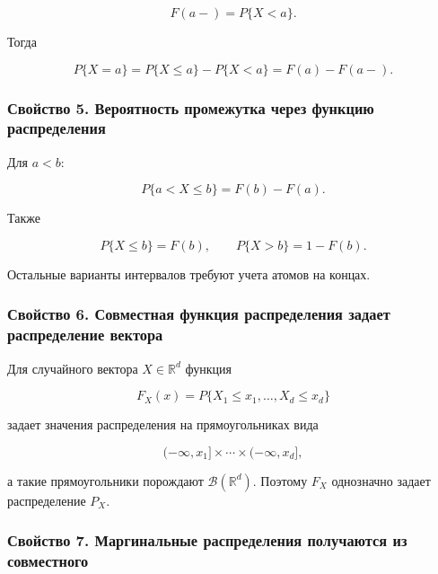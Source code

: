 \documentclass[
  11pt,
  a4paper,
]{article}
\begin{document}
\[
F(a-)=P\{X<a\}.
\]

Тогда

\[
P\{X=a\}=P\{X\le a\}-P\{X<a\}=F(a)-F(a-).
\]

\subsubsection{Свойство 5. Вероятность промежутка через функцию
распределения}\label{ux441ux432ux43eux439ux441ux442ux432ux43e-5.-ux432ux435ux440ux43eux44fux442ux43dux43eux441ux442ux44c-ux43fux440ux43eux43cux435ux436ux443ux442ux43aux430-ux447ux435ux440ux435ux437-ux444ux443ux43dux43aux446ux438ux44e-ux440ux430ux441ux43fux440ux435ux434ux435ux43bux435ux43dux438ux44f}

Для \(a<b\):

\[
P\{a<X\le b\}=F(b)-F(a).
\]

Также

\[
P\{X\le b\}=F(b),\qquad
P\{X>b\}=1-F(b).
\]

Остальные варианты интервалов требуют учета атомов на концах.

\subsubsection{Свойство 6. Совместная функция распределения задает
распределение
вектора}\label{ux441ux432ux43eux439ux441ux442ux432ux43e-6.-ux441ux43eux432ux43cux435ux441ux442ux43dux430ux44f-ux444ux443ux43dux43aux446ux438ux44f-ux440ux430ux441ux43fux440ux435ux434ux435ux43bux435ux43dux438ux44f-ux437ux430ux434ux430ux435ux442-ux440ux430ux441ux43fux440ux435ux434ux435ux43bux435ux43dux438ux435-ux432ux435ux43aux442ux43eux440ux430}

Для случайного вектора \(X\in\mathbb R^d\) функция

\[
F_X(x)=P\{X_1\le x_1,\ldots,X_d\le x_d\}
\]

задает значения распределения на прямоугольниках вида

\[
(-\infty,x_1]\times\cdots\times(-\infty,x_d],
\]

а такие прямоугольники порождают \(\mathcal B(\mathbb R^d)\). Поэтому
\(F_X\) однозначно задает распределение \(P_X\).

\subsubsection{Свойство 7. Маргинальные распределения получаются из
совместного}\label{ux441ux432ux43eux439ux441ux442ux432ux43e-7.-ux43cux430ux440ux433ux438ux43dux430ux43bux44cux43dux44bux435-ux440ux430ux441ux43fux440ux435ux434ux435ux43bux435ux43dux438ux44f-ux43fux43eux43bux443ux447ux430ux44eux442ux441ux44f-ux438ux437-ux441ux43eux432ux43cux435ux441ux442ux43dux43eux433ux43e}
\end{document}
